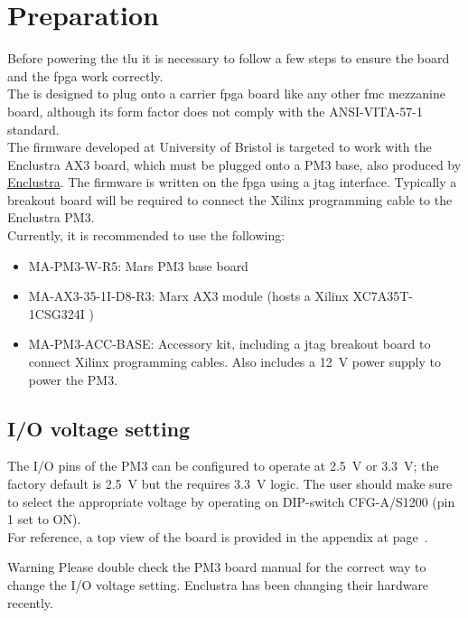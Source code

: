 \chapter{Preparation}\label{ch:preparation}
Before powering the \gls{tlu} it is necessary to follow a few steps to ensure the board and the \gls{fpga} work correctly.\\
The \brd is designed to plug onto a carrier \gls{fpga} board like any other \gls{fmc} mezzanine board, although its form factor does not comply with the ANSI-VITA-57-1 standard.\\
The firmware developed at University of Bristol is targeted to work with the Enclustra  AX3 board, which must be plugged onto a PM3 base, also produced by \href{http://www.enclustra.com/en/home/}{Enclustra}. The firmware is written on the \gls{fpga} using a \gls{jtag} interface. Typically a breakout board will be required to connect the Xilinx programming cable to the Enclustra PM3.\\
Currently, it is recommended to use the following:
\begin{itemize}
 \item MA-PM3-W-R5: Mars PM3 base board
 \item MA-AX3-35-1I-D8-R3: Marx AX3 module (hosts a Xilinx XC7A35T-1CSG324I )
 \item MA-PM3-ACC-BASE: Accessory kit, including a \gls{jtag} breakout board to connect Xilinx programming cables. Also includes a 12~V power supply to power the PM3.
\end{itemize}

\section{I/O voltage setting}
The I/O pins of the PM3 can be configured to operate at 2.5~V or 3.3~V; the factory default is 2.5~V but the \brd requires 3.3~V logic. The user should make sure to select the appropriate voltage by operating on DIP-switch CFG-A/S1200 (pin 1 set to ON).\\For reference, a top view of the board is provided in the appendix at page~\pageref{ch:appendix}.\\
\begin{alertinfo}{Warning}
    Please double check the PM3 board manual for the correct way to change the I/O voltage setting. Enclustra has been changing their hardware recently.
\end{alertinfo}

